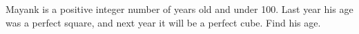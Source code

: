 Mayank is a positive integer number of years old and under 100. Last year his age was a perfect square, and next year it will be a perfect cube. Find his age.
